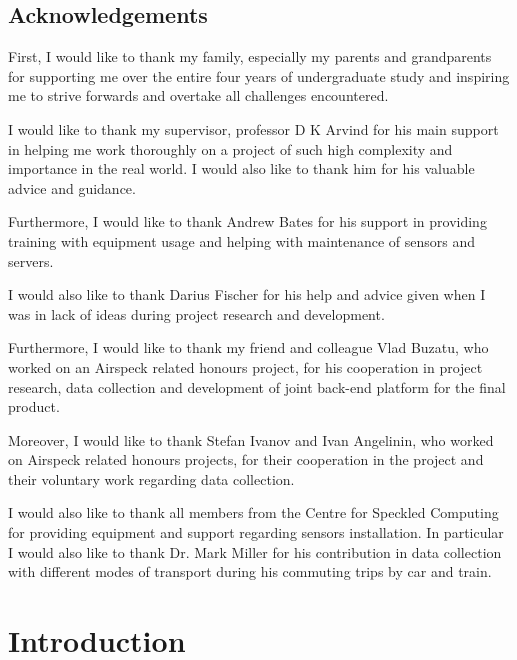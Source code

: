 \documentclass[bsc,frontabs,twoside,singlespacing, parskip,deptreport]{infthesis}     %
\begin{document}
\maketitle

\section*{Acknowledgements}

First, I would like to thank my family, especially my parents and grandparents for supporting me over the entire four years of undergraduate study and inspiring me to strive forwards and overtake all challenges encountered.

I would like to thank my supervisor, professor D K Arvind for his main support in helping me work thoroughly on a project of such high complexity and importance in the real world. I would also like to thank him for his valuable advice and guidance.

Furthermore, I would like to thank Andrew Bates for his support in providing training with equipment usage and helping with maintenance of sensors and servers.

I would also like to thank Darius Fischer for his help and advice given when I was in lack of ideas during project research and development.

Furthermore, I would like to thank my friend and colleague Vlad Buzatu, who worked on an Airspeck related honours project, for his cooperation in project research, data collection and development of joint back-end platform for the final product.

Moreover, I would like to thank Stefan Ivanov and Ivan Angelinin, who worked on Airspeck related honours projects, for their cooperation in the project and their voluntary work regarding data collection.

I would also like to thank all members from the Centre for Speckled Computing for providing equipment and support regarding sensors installation. In particular I would also like to thank Dr. Mark Miller for his contribution in data collection with different modes of transport during his commuting trips by car and train.


\tableofcontents



\chapter{Introduction}
\end{document}
